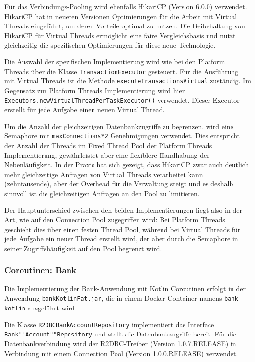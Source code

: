 \documentclass[fontsize=12pt,paper=a4,twoside=semi,parskip=half-,headsepline,headinclude]{scrreprt}
\begin{document}
Für das Verbindungs-Pooling wird ebenfalls HikariCP (Version 6.0.0) verwendet. HikariCP hat in neueren Versionen Optimierungen für die Arbeit mit Virtual Threads eingeführt, um deren Vorteile optimal zu nutzen. Die Beibehaltung von HikariCP für Virtual Threads ermöglicht eine faire Vergleichsbasis und nutzt gleichzeitig die spezifischen Optimierungen für diese neue Technologie.

Die Auswahl der spezifischen Implementierung wird wie bei den Platform Threads über die Klasse \texttt{TransactionExecutor} gesteuert. Für die Ausführung mit Virtual Threads ist die Methode \texttt{executeTransactionsVirtual} zuständig.
Im Gegensatz zur Platform Threads Implementierung wird hier \texttt{Executors.newVirtualThreadPerTaskExecutor()} verwendet. Dieser Executor erstellt für jede Aufgabe einen neuen Virtual Thread.

Um die Anzahl der gleichzeitigen Datenbankzugriffe zu begrenzen, wird eine Semaphore mit \texttt{maxConnections*2} Genehmigungen verwendet. Dies entspricht der Anzahl der Threads im Fixed Thread Pool der Platform Threads Implementierung, gewährleistet aber eine flexiblere Handhabung der Nebenläufigkeit. In der Praxis hat sich gezeigt, dass HikariCP zwar auch deutlich mehr gleichzeitige Anfragen von Virtual Threads verarbeitet kann (zehntausende), aber der Overhead für die Verwaltung steigt und es deshalb sinnvoll ist die gleichzeitigen Anfragen an den Pool zu limitieren.

Der Hauptunterschied zwischen den beiden Implementierungen liegt also in der Art, wie auf den Connection Pool zugegriffen wird: Bei Platform Threads geschieht dies über einen festen Thread Pool, während bei Virtual Threads für jede Aufgabe ein neuer Thread erstellt wird, der aber durch die Semaphore in seiner Zugriffshäufigkeit auf den Pool begrenzt wird.

\subsubsection{Coroutinen: Bank}

Die Implementierung der Bank-Anwendung mit Kotlin Coroutinen erfolgt in der Anwendung \texttt{bankKotlinFat.jar}, die in einem Docker Container namens \texttt{bank-kotlin} ausgeführt wird.

Die Klasse \texttt{R2DBCBankAccountRepository} implementiert das Interface \texttt{Bank""Account""Repository} und stellt die Datenbankzugriffe bereit. Für die Datenbankverbindung wird der R2DBC-Treiber (Version 1.0.7.RELEASE) in Verbindung mit einem Connection Pool (Version 1.0.0.RELEASE) verwendet. 
\end{document}
